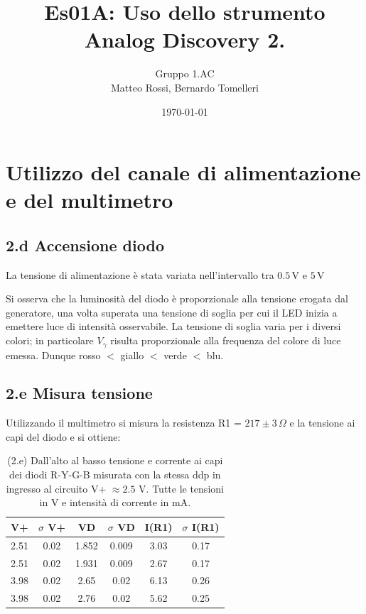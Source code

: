 \documentclass[10pt, a4paper, italian]{article}
\author{Gruppo 1.AC \\ Matteo Rossi, Bernardo Tomelleri}
\title{Es01A: Uso dello strumento Analog Discovery 2.}
\begin{document}
\date{\today}
\maketitle

\setcounter{section}{1}

\section{Utilizzo del canale di alimentazione e del multimetro}

\subsection*{2.d Accensione diodo}

La tensione di alimentazione \`e stata variata nell'intervallo tra
$0.5\,\mathrm{V}$ e $5\,\mathrm{V}$


Si osserva che la luminosit\`a del diodo è proporzionale alla tensione
erogata dal generatore, una volta superata una tensione di soglia per cui
il LED inizia a emettere luce di intensità osservabile. La tensione di soglia
varia per i diversi colori; in particolare $V_\gamma$ risulta
proporzionale alla frequenza del colore di luce emessa. Dunque
rosso $<$ giallo $<$ verde $<$ blu.

\subsection*{2.e Misura tensione}
Utilizzando il multimetro si misura la resistenza R1 = $217 \pm 3 \,\Omega$
e la tensione ai capi del diodo e si ottiene:

\begin{table}[htb]
\centering
\begin{tabular}{|c|c|c|c|c|c|}
\hline
V+& $\sigma$ V+  & VD & $\sigma$ VD & I(R1)  & $\sigma$ I(R1) \\
\hline 
2.51 & 0.02 & 1.852 & 0.009 & 3.03 & 0.17 \\
2.51 & 0.02 & 1.931 & 0.009 & 2.67 & 0.17 \\
3.98 & 0.02 & 2.65 & 0.02 & 6.13 & 0.26 \\
3.98 & 0.02 & 2.76 & 0.02 & 5.62 & 0.25\\
\hline 
\end{tabular} 
\caption{(2.e) Dall'alto al basso tensione e corrente ai capi dei diodi
R-Y-G-B misurata con la stessa ddp in ingresso al circuito V+ $\approx 2.5$ V.
Tutte le tensioni in V e intensità di corrente in mA.\label{tab:VD-ID}}
\end{table}
\end{document}
